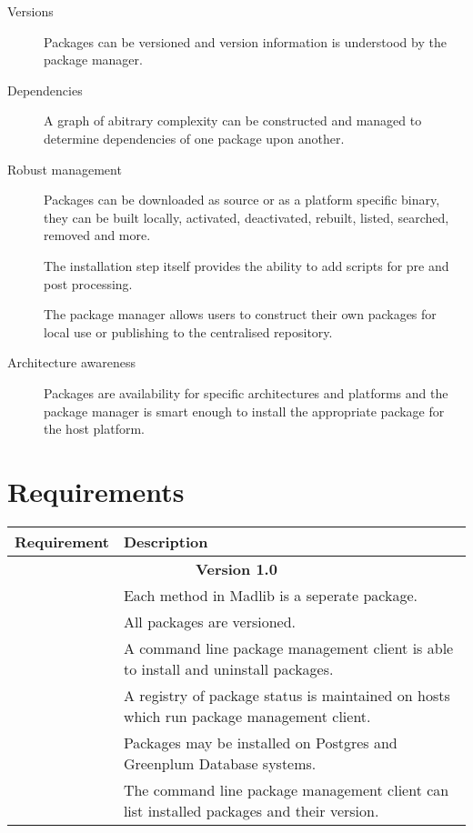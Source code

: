 \documentclass[11pt]{article}
\begin{document}
{\begin{description}
	\item[Versions] Packages can be versioned and version information is
	understood by the package manager.

	\item[Dependencies] A graph of abitrary complexity can be constructed and
	managed to determine dependencies of one package upon another.

	\item[Robust management] Packages can be downloaded as source or as a
	platform specific binary, they can be built locally, activated, deactivated,
	rebuilt, listed, searched, removed and more.
	
	The installation step itself provides the ability to add scripts for pre and
	post processing.

	The package manager allows users to construct their own packages for local
	use or publishing to the centralised repository.

	\item[Architecture awareness] Packages are availability for specific
	architectures and platforms and the package manager is smart enough to
	install the appropriate package for the host platform.

\end{description}

\ifx\pdfoutput\undefined %
\else
{}
\fi

\section{Requirements}

\begin{mlreq}
\begin{tabular}{|l|p{133mm}|}
\hline
	\textbf{Requirement} & \textbf{Description} \\
\hline
	\multicolumn{2}{|c|}{\bf Version 1.0} \\
\hline
	\mlr & Each method in Madlib is a seperate package. \\
\hline
	\mlr & All packages are versioned. \\
\hline
	\mlr & A command line package management client is able to install
	       and uninstall packages. \\
\hline
	\mlr & A registry of package status is maintained on hosts which run
		   package management client. \\
\hline
	\mlr & Packages may be installed on Postgres and Greenplum Database
		   systems. \\
\hline
	\mlr & The command line package management client can list installed
		   packages and their version. \\


\end{tabular}
\end{mlreq}}
\end{document}

